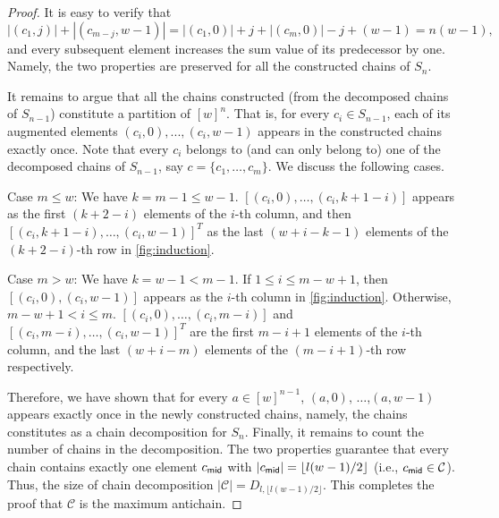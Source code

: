 \begin{proof}
       
      
It is easy to verify that
\[
    |(c_{1}, j)| + |(c_{m - j}, w-1)|
    =
    |(c_{1}, 0)|+j + |(c_{m}, 0)|- j+(w-1)
    =
    n(w-1),
\]
and every subsequent element increases the sum value of its predecessor by one.
Namely, the two properties are preserved for all the constructed chains of
$S_{n}$.
     
It remains to argue that all the chains constructed (from the decomposed chains of  $S_{n-1}$) constitute a  partition of $[w]^n$. 
That is, for every  $c_i \in S_{n-1}$, each of its augmented elements $(c_i,0),...,(c_i,w-1)$ appears in the constructed chains exactly once. Note that every $c_i$ belongs to (and can only belong to) one of the decomposed chains of  $S_{n-1}$, say $c=\{c_1,\ldots, c_m\}$. We discuss the following cases.
     
Case $m\leq w$: We have $k=m-1\leq w-1$. $[(c_i,0),\ldots, (c_i,k+1-i)]$
appears as the first $(k+2-i)$ elements of the $i$-th column, and then $[(c_i,k+1-i),\ldots, (c_i,w-1)]^T$ as the last $(w+i-k-1)$ elements of the $(k+2-i)$-th row in \cref{fig:induction}. 
    
Case $m> w$: We have $k=w-1 < m-1$. If $1\leq i\leq m-w+1$, then $[(c_i,0),(c_i,w-1)]$ appears as the $i$-th column in \cref{fig:induction}. Otherwise, $m-w+1<i\leq m$. $[(c_i,0),\ldots, (c_i,m-i)]$ and $[(c_i,m-i),\ldots, (c_i,w-1)]^T$
are  the first $m-i+1$ elements of the $i$-th column, and the last $(w+i-m)$ elements of the $(m-i+1)$-th row respectively.
     
Therefore, we have shown that for every $a \in [w]^{n-1}$, $(a, 0)$, $\ldots$,$(a,w-1)$ appears exactly once in the newly constructed chains, namely, the chains constitutes as a chain decomposition for $S_n$. Finally, it remains to count the number of chains in the decomposition. 
The two properties guarantee  that every chain contains exactly one element $c_{\sf mid}$ with $|c_{\sf mid}|=\lfloor l(w-1)/2 \rfloor$ (i.e., $c_{\sf mid} \in \mathcal{C}$). Thus, the size of chain decomposition $|\mathcal{C}| = D_{l, \lfloor{l(w-1)/2}\rfloor}$. This completes the proof that $\mathcal{C}$ is the maximum antichain.
 
\end{proof}

